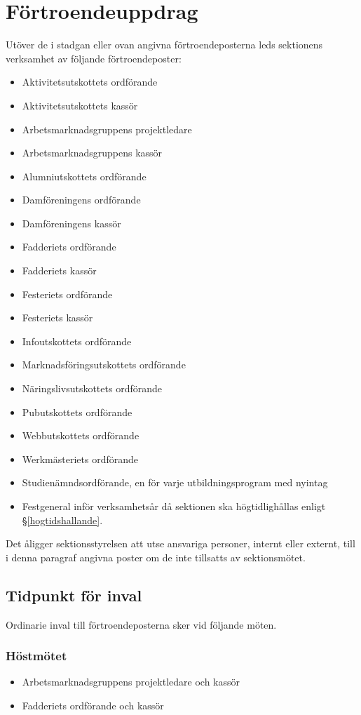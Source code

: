 \documentclass{datateknologsektionen-document}
\begin{document}
\section{Förtroendeuppdrag}
Utöver de i stadgan eller ovan angivna förtroendeposterna leds sektionens verksamhet av följande förtroendeposter:
\begin{itemize}
  \item Aktivitetsutskottets ordförande
  \item Aktivitetsutskottets kassör
  \item Arbetsmarknadsgruppens projektledare
  \item Arbetsmarknadsgruppens kassör
  \item Alumniutskottets ordförande
  \item Damföreningens ordförande
  \item Damföreningens kassör
  \item Fadderiets ordförande
  \item Fadderiets kassör
  \item Festeriets ordförande
  \item Festeriets kassör
  \item Infoutskottets ordförande
  \item Marknadsföringsutskottets ordförande
  \item Näringslivsutskottets ordförande
  \item Pubutskottets ordförande
  \item Webbutskottets ordförande
  \item Werkmästeriets ordförande
  \item Studienämndsordförande, en för varje utbildningsprogram med nyintag
  \item Festgeneral inför verksamhetsår då sektionen ska högtidlighållas enligt \S \ref{hogtidshallande}.
\end{itemize}
Det åligger sektionsstyrelsen att utse ansvariga personer, internt eller externt, till i denna paragraf angivna poster om de inte tillsatts av sektionsmötet.

\subsection{Tidpunkt för inval}
Ordinarie inval till förtroendeposterna sker vid följande möten.

\subsubsection{Höstmötet}
\begin{itemize}
  \item Arbetsmarknadsgruppens projektledare och kassör
  \item Fadderiets ordförande och kassör
\end{itemize}
\end{document}
